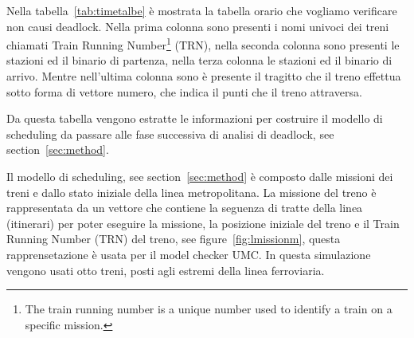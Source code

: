 \documentclass{ewic}
\begin{document}
Nella tabella~\ref{tab:timetalbe} è mostrata la tabella orario che vogliamo verificare non causi deadlock. Nella prima colonna sono presenti i nomi univoci dei treni chiamati Train Running Number\footnote{The train running number is a unique number used to identify a train on a specific mission.} (TRN), nella seconda colonna sono presenti le stazioni ed il binario di partenza, nella terza colonna le stazioni ed il binario di arrivo. Mentre nell'ultima colonna sono è presente il tragitto che il treno effettua sotto forma di vettore numero, che indica il punti che il treno attraversa.

Da questa tabella vengono estratte le informazioni per costruire il modello di scheduling da passare alle fase successiva di analisi di deadlock, see section~\ref{sec:method}.
			
			Il modello di scheduling, see section~\ref{sec:method} è composto dalle missioni dei treni e dallo stato iniziale della linea metropolitana.
			La missione del treno è rappresentata da un vettore che contiene la seguenza di tratte della linea (itinerari) per poter eseguire la missione, la posizione iniziale del treno e il Train Running Number (TRN) del treno, see figure~\ref{fig:lmissionm}, questa rapprensetazione è usata per il model checker UMC.
			In questa simulazione vengono usati otto treni, posti agli estremi della linea ferroviaria. 
			
\end{document}
